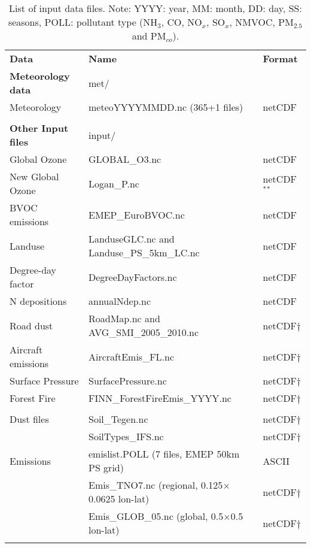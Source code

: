 \begin{table}
\caption[List of input data files]{List of input data files.
Note: YYYY: year, MM: month, DD: day, SS: seasons, POLL: pollutant
type (NH$_3$, CO, NO$_x$, SO$_x$, NMVOC,
PM$_{2.5}$ and PM$_{co}$). 
\label{Tab:inputdata}}
\begin{center}
\begin{small}
\begin{tabular}{lll}
\hline
{\bf Data} &  {\bf Name} & {\bf Format}\\
{\bf Meteorology data} & met/&  \\
Meteorology  &  meteoYYYYMMDD.nc \quad (365+1 files) & netCDF\\
& & \\
{\bf Other Input files} & input/ &\\
Global Ozone & GLOBAL\_O3.nc & netCDF\\
New Global Ozone & Logan\_P.nc & netCDF $^*$$^*$\\
BVOC emissions & EMEP\_EuroBVOC.nc & netCDF\\
Landuse & LanduseGLC.nc and Landuse\_PS\_5km\_LC.nc  & netCDF\\
Degree-day factor & DegreeDayFactors.nc &  netCDF\\
N depositions & annualNdep.nc  & netCDF\\
Road dust &  RoadMap.nc and AVG\_SMI\_2005\_2010.nc& netCDF$\dagger$ \\
Aircraft emissions & AircraftEmis\_FL.nc & netCDF$\dagger$ \\
Surface Pressure & SurfacePressure.nc & netCDF$\dagger$ \\
Forest Fire & FINN\_ForestFireEmis\_YYYY.nc & netCDF$\dagger$ \\
& & \\
Dust files  &Soil\_Tegen.nc  & netCDF$\dagger$\\
 & SoilTypes\_IFS.nc & netCDF$\dagger$\\
Emissions & emislist.POLL  \quad ({\footnotesize 7 files, EMEP 50km PS grid}) & ASCII\\
 & Emis\_TNO7.nc \quad ({\footnotesize regional, 0.125$\times$0.0625 lon-lat})& netCDF$\dagger$\\
 & Emis\_GLOB\_05.nc \quad ({\footnotesize global, 0.5$\times$0.5 lon-lat})& netCDF$\dagger$\\
$$
\end{tabular}
\end{small}
\end{center}
\end{table}
